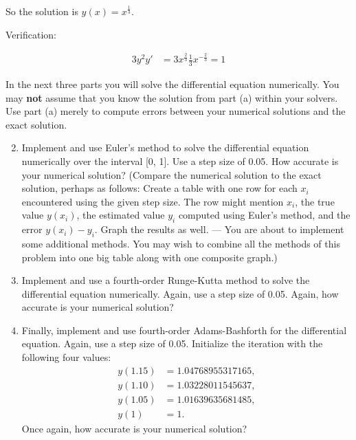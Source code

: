 \documentclass[conference,onecolumn]{IEEEtran}
\begin{document}
\begin{enumerate}
\begin{enumerate}
                        So the solution is $y(x) = x^{\frac{1}{3}}$.

                        Verification:

                        \begin{align*}
                              3 y^2 y' & = 3 x^{\frac{2}{3}} \frac{1}{3} x^{-\frac{2}{3}} = 1
                        \end{align*}
            \end{enumerate}

            In the next three parts you will solve the differential equation numerically.
            You may \textbf{not} assume that you know the solution from part (a) within your solvers.
            Use part (a) merely to compute errors between your numerical solutions and the exact solution.

            \begin{enumerate}
                  \setcounter{enumii}{1}
                  \item Implement and use Euler's method to solve the differential equation numerically over the interval [0, 1].
                        Use a step size of 0.05.
                        How accurate is your numerical solution?
                        (Compare the numerical solution to the exact solution, perhaps as follows: Create a table with one row for each $x_i$ encountered using the given step size.
                        The row might mention $x_i$, the true value $y(x_i)$, the estimated value $y_i$ computed using Euler's method, and the error $y(x_i) - y_i$.
                        Graph the results as well.
                        — You are about to implement some additional methods.
                        You may wish to combine all the methods of this problem into one big table along with one composite graph.)

                  \item Implement and use a fourth-order Runge-Kutta method to solve the differential equation numerically.
                        Again, use a step size of 0.05.
                        Again, how accurate is your numerical solution?

                  \item Finally, implement and use fourth-order Adams-Bashforth for the differential equation.
                        Again, use a step size of 0.05.
                        Initialize the iteration with the following four values:
                        \begin{align*}
                              y(1.15) & = 1.04768955317165, \\
                              y(1.10) & = 1.03228011545637, \\
                              y(1.05) & = 1.01639635681485, \\
                              y(1)    & = 1.
                        \end{align*}
                        Once again, how accurate is your numerical solution?
            \end{enumerate}


\end{enumerate}
\end{document}
